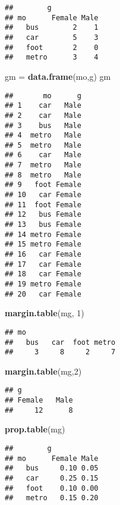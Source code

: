 \documentclass[
]{article}
\newenvironment{Shaded}{\begin{snugshade}}{\end{snugshade}}
\newcommand{\DecValTok}[1]{\textcolor[rgb]{0.00,0.00,0.81}{#1}}
\newcommand{\FunctionTok}[1]{\textcolor[rgb]{0.13,0.29,0.53}{\textbf{#1}}}
\newcommand{\NormalTok}[1]{#1}
\newcommand{\OtherTok}[1]{\textcolor[rgb]{0.56,0.35,0.01}{#1}}
\begin{document}
\begin{verbatim}
##        g
## mo      Female Male
##   bus        2    1
##   car        5    3
##   foot       2    0
##   metro      3    4
\end{verbatim}

\begin{Shaded}
\begin{Highlighting}[]
\NormalTok{gm }\OtherTok{=} \FunctionTok{data.frame}\NormalTok{(mo,g)}
\NormalTok{gm}
\end{Highlighting}
\end{Shaded}

\begin{verbatim}
##       mo      g
## 1    car   Male
## 2    car   Male
## 3    bus   Male
## 4  metro   Male
## 5  metro   Male
## 6    car   Male
## 7  metro   Male
## 8  metro   Male
## 9   foot Female
## 10   car Female
## 11  foot Female
## 12   bus Female
## 13   bus Female
## 14 metro Female
## 15 metro Female
## 16   car Female
## 17   car Female
## 18   car Female
## 19 metro Female
## 20   car Female
\end{verbatim}

\begin{Shaded}
\begin{Highlighting}[]
\FunctionTok{margin.table}\NormalTok{(mg, }\DecValTok{1}\NormalTok{)}
\end{Highlighting}
\end{Shaded}

\begin{verbatim}
## mo
##   bus   car  foot metro 
##     3     8     2     7
\end{verbatim}

\begin{Shaded}
\begin{Highlighting}[]
\FunctionTok{margin.table}\NormalTok{(mg,}\DecValTok{2}\NormalTok{)}
\end{Highlighting}
\end{Shaded}

\begin{verbatim}
## g
## Female   Male 
##     12      8
\end{verbatim}

\begin{Shaded}
\begin{Highlighting}[]
\FunctionTok{prop.table}\NormalTok{(mg)}
\end{Highlighting}
\end{Shaded}

\begin{verbatim}
##        g
## mo      Female Male
##   bus     0.10 0.05
##   car     0.25 0.15
##   foot    0.10 0.00
##   metro   0.15 0.20
\end{verbatim}
\end{document}

